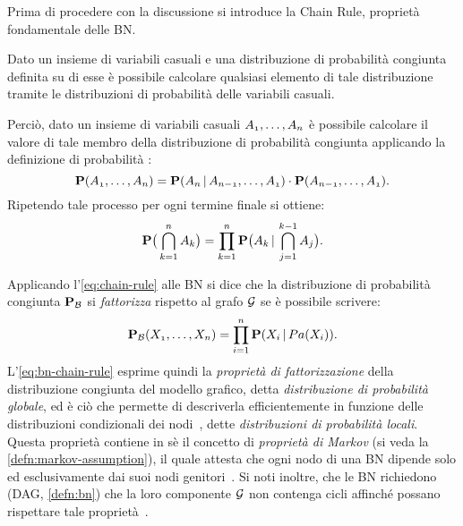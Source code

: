 Prima di procedere con la discussione si introduce la Chain Rule, proprietà fondamentale delle \acs{BN}.

\begin{teorema}
Dato un insieme di variabili casuali e una distribuzione di probabilità congiunta definita su di esse è possibile calcolare qualsiasi elemento di tale distribuzione tramite le distribuzioni di probabilità \cond*{} delle variabili casuali.
\end{teorema}

Perciò, dato un insieme di variabili casuali $\mathnormal{A_1},\dotsc,\mathnormal{A_n}$ è possibile calcolare il valore di tale membro della distribuzione di probabilità congiunta applicando la definizione di probabilità \cond*{}:
\[
\mathbf{P}(\mathnormal{A_1},\dotsc,\mathnormal{A_n})=\mathbf{P}(\mathnormal{A_n}\,\arrowvert\,\mathnormal{A_{n-1}},\dotsc,\mathnormal{A_1})\cdot\mathbf{P}(\mathnormal{A_{n-1}},\dotsc,\mathnormal{A_1})\text{.}
\]
Ripetendo tale processo per ogni termine finale si ottiene:
\begin{equation}
\label{eq:chain-rule}
\mathbf{P}\big(\bigcap_{k=1}^{n}\mathnormal{A_k}\big)=\prod_{k=1}^{n}\mathbf{P}\big(\mathnormal{A_k}\,\arrowvert\,\bigcap_{j=1}^{k-1}\mathnormal{A_j}\big)\text{.}
\end{equation}

Applicando l'\autoref{eq:chain-rule} alle \acl{BN} si dice che la distribuzione di probabilità congiunta $\mathbf{P}_{\mathcal{B}}$ si \emph{fattorizza} rispetto al grafo $\mathcal{G}$ se è possibile scrivere:
\begin{equation}\label{eq:bn-chain-rule}
\mathbf{P}_{\mathcal{B}}(\mathnormal{X_1}, \dotsc, \mathnormal{X_n})=\prod_{i=1}^{n}\mathbf{P}(\mathnormal{X_i}\,\arrowvert\,Pa(\mathnormal{X_i}))\text{.}
\end{equation}
L'\autoref{eq:bn-chain-rule} esprime quindi la \emph{proprietà di fattorizzazione} della distribuzione congiunta del modello grafico, detta \emph{distribuzione di probabilità globale}, ed è ciò che permette di descriverla efficientemente in funzione delle distribuzioni condizionali dei nodi~\citep[][sezione 14.2]{Russel2003}, dette \emph{distribuzioni di probabilità locali}. Questa proprietà contiene in sè il concetto di \emph{proprietà di Markov} (si veda la \autoref{defn:markov-assumption}), il quale attesta che ogni nodo di una \acl{BN} dipende solo ed esclusivamente dai suoi nodi genitori~\citep[][sottosezione 2.2.4]{Korb2011}. Si noti inoltre, che le \acl{BN} richiedono (\acs{DAG}, \autoref{defn:bn}) che la loro componente $\mathcal{G}$ non contenga cicli  affinché possano rispettare tale proprietà~\citep[][sezione 14.1]{Russel2003}.

